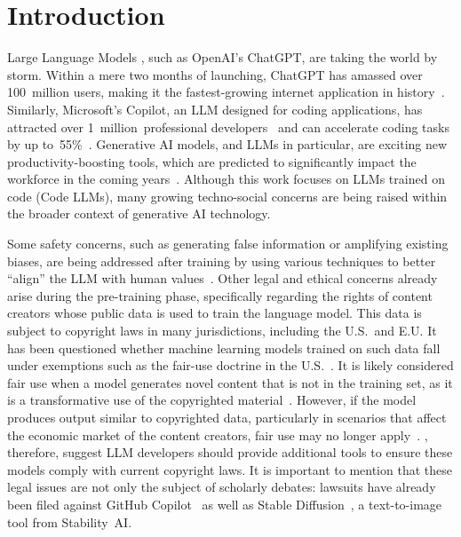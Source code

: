 \section{Introduction}

Large Language Models \citep[LLMs;][]{brown2020language, chen2021codex,chowdhery2022palm,zhang2022opt,openai2023gpt4}, such as OpenAI's ChatGPT, are taking the world by storm. Within a mere two months of launching, ChatGPT has amassed over 100~million users, making it the fastest-growing internet application in history~\citep{guardian2023chatgpt}. Similarly, Microsoft’s Copilot, an LLM designed for coding applications, has attracted over 1~million~professional developers~\citep{euronews2023copilot} and can accelerate coding tasks by up to~55\%~\citep{kalliamvakou2022copilot}. 
Generative AI models, and LLMs in particular, are exciting new productivity-boosting tools, which are predicted to significantly impact the workforce in the coming years~\citep{eloundou2023gpts, stanford2022foundation,wef2023futureofjobs}. Although this work focuses on LLMs trained on code (Code LLMs), many growing techno-social concerns are being raised within the broader context of generative AI technology.  

Some safety concerns, such as generating false information or amplifying existing biases, are being addressed after training by using various techniques to better ``align'' the LLM with human values~\citep{stiennon2020learning,bai2022training,perez2022red}. Other legal and ethical concerns already arise during the pre-training phase, specifically regarding the rights of content creators whose public data is used to train the language model. This data is subject to copyright laws in many jurisdictions, including the U.S.\ and E.U. It has been questioned whether machine learning models trained on such data fall under exemptions such as the fair-use doctrine in the U.S.~\citep{kuhn2022copilot,butterick2022copilot,rothchild2022copyright}. It is likely considered fair use when a model generates novel content that is not in the training set, as it is a transformative use of the copyrighted material~\citep{lemley2020fair}. However, if the model produces output similar to copyrighted data, particularly in scenarios that affect the economic market
of the content creators, fair use may no longer apply~\citep{levendowski2018copyright}. \citet{henderson2023foundation}, therefore, suggest LLM developers should provide additional tools to ensure these models comply with current copyright laws. It is important to mention that these legal issues are not only the subject of scholarly debates: lawsuits have already been filed against GitHub Copilot~\citep{DOE1vGitHub} as well as Stable Diffusion~\citep{stablediffusion_lawsuit}, a text-to-image tool from Stability~AI. 

